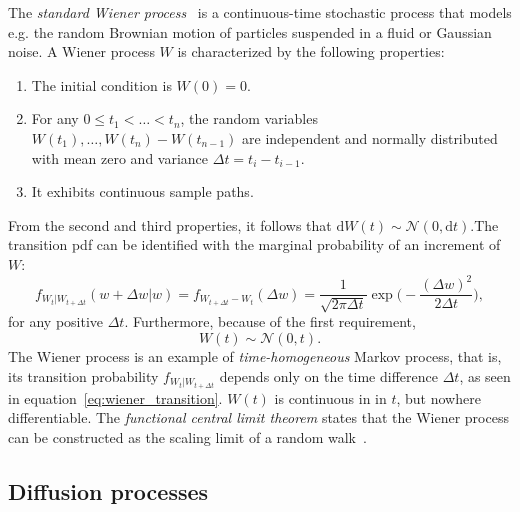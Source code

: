 \documentclass[a4paper,12pt]{book}
\begin{document}
 
The \textit{standard Wiener process}~\parencite{wiener1923} is a continuous-time stochastic process that models e.g. the random Brownian motion of particles suspended in a fluid or Gaussian noise. A Wiener process $W$ is characterized by the following properties:
\begin{enumerate}
\item The initial condition is $W(0) = 0$.
\item For any $0 \leq t_1 < \ldots < t_n$, the random variables $W(t_1), \ldots, W(t_n) - W(t_{n-1})$ are independent and normally distributed with mean zero and variance $\Delta t =t_i-t_{i-1}$.
\item It exhibits continuous sample paths.
\end{enumerate}
From the second and third properties, it follows that $\mathrm{d}W(t) \sim \mathcal{N}(0,\mathrm{d}t)$.The transition \acrshort{pdf} can be identified with the marginal probability of an increment of $W$:
\begin{equation}
\label{eq:wiener_transition}
    f_{W_t|W_{t+\Delta t}}(w+\Delta w|w) = f_{W_{t+\Delta t}-W_t}(\Delta w)=\frac{1}{\sqrt{2\pi \Delta t}}\exp \biggl (-\frac{(\Delta w)^2}{2\Delta t} \biggr),
\end{equation}
for any positive $\Delta t$. Furthermore, because of the first requirement, 
\begin{equation}
    W(t) \sim \mathcal{N}(0,t).  
\end{equation}
The Wiener process is an example of \textit{time-homogeneous} Markov process, that is, its transition probability $ f_{W_t|W_{t+\Delta t}}$ depends only on the time difference $\Delta t$, as seen in equation~\eqref{eq:wiener_transition}. $W(t)$ is continuous in in $t$, but nowhere differentiable. The \textit{functional central limit
theorem} states that the Wiener process can be constructed as the scaling limit of a random walk~\parencite{Donsker}. 

\subsection{Diffusion processes}
\end{document}

